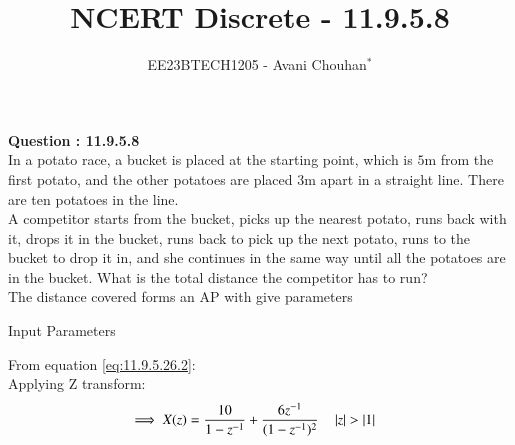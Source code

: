 \documentclass[journal,12pt,twocolumn]{IEEEtran}
\theoremstyle{remark}
\begin{document}

\vspace{3cm}

\title{NCERT Discrete - 11.9.5.8}
\author{EE23BTECH1205 - Avani Chouhan$^{*}$%
}
\maketitle
\newpage
\bigskip

\renewcommand{\thefigure}{\theenumi}
\renewcommand{\thetable}{\theenumi}

\vspace{3cm}
\textbf{Question : 11.9.5.8} \\
In a potato race, a bucket is placed at the starting point, which is $5$m from the first potato, and the other potatoes are placed $3$m apart in a straight line. There are ten potatoes in the line.\\
A competitor starts from the bucket, picks up the nearest potato, runs back with it, drops it in the bucket, runs back to pick up the next potato, runs to the bucket to drop it in, and she continues in the same way until all the potatoes are in the bucket. What is the total distance the competitor has to run?\\

\solution
The distance covered forms an AP with give parameters \\
\begin{table}
 \centering
  
  \caption{Input Parameters}
 \end{table}
 From equation \eqref{eq:11.9.5.26.2}: \\
Applying Z transform:
\begin{align}
   \implies X(z) &=\frac{10}{1-z^{-1}} + \frac{6z^{-1}}{(1-z^{-1})^2} 
    \quad \left\vert z\right\vert>\left\vert1\right\vert
\end{align}
\end{document}
